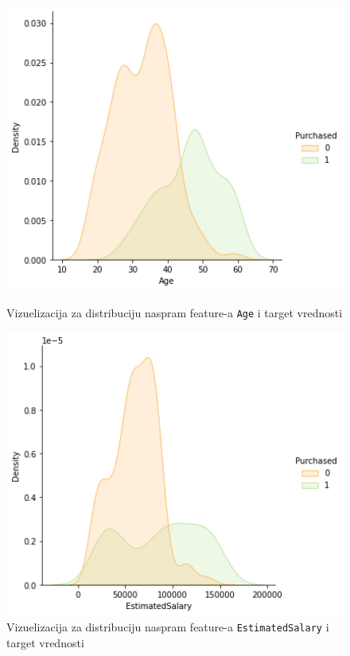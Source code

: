 \documentclass[fontsize=12bp, paper=a4]{scrarticle}
\begin{document}
\begin{figure}[tbp!]
    \centering
    \begin{minipage}[b]{0.45\textwidth}
        \includegraphics[width=1\textwidth]{30.png}
        \caption{\centering Vizuelizacija za distribuciju naspram feature-a \texttt{Age} i target vrednosti}
    \end{minipage}
    \hfill
    \begin{minipage}[b]{0.45\textwidth}
        \includegraphics[width=1\textwidth]{31.png}
        \caption{\centering Vizuelizacija za distribuciju naspram feature-a \texttt{EstimatedSalary} i target vrednosti}
    \end{minipage}
\end{figure}   
\end{document}

